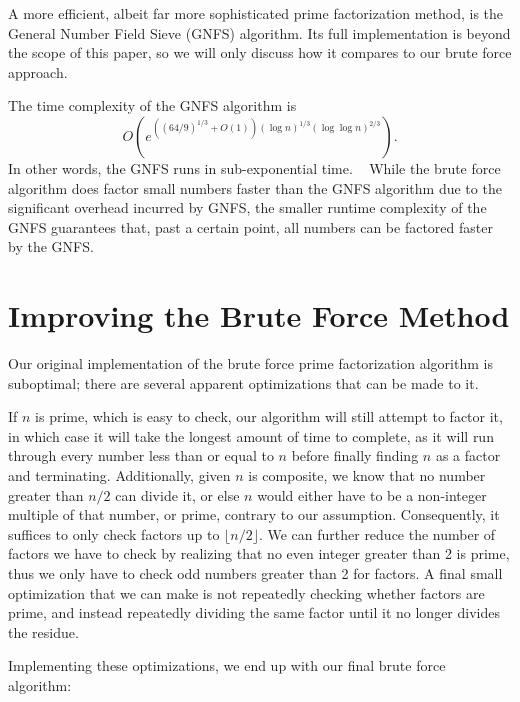 \documentclass[letterpaper,twocolumn,12pt]{article}
\newcommand{\parens}[1]{\left( #1 \right)}
\begin{document}
    A more efficient, albeit far more sophisticated prime factorization
    method, is the General Number Field Sieve (GNFS) algorithm.
    Its full implementation is beyond the scope of this paper, so we will
    only discuss how it compares to our brute force approach.

    The time complexity of the GNFS algorithm is
    \[
        O\parens{e^{
            \parens{(64 / 9)^{1 / 3} + O(1)}
            \parens{\log n}^{1 / 3}(\log\log n)^{2 / 3}
        }}.
    \]
    In other words, the GNFS runs in sub-exponential time.
    ~\cite{TOTS}
    While the brute force algorithm does factor small numbers faster than the
    GNFS algorithm due to the significant overhead incurred by GNFS, the smaller
    runtime complexity of the GNFS guarantees that, past a certain point, all
    numbers can be factored faster by the GNFS.

    \section*{Improving the Brute Force Method}

    Our original implementation of the brute force prime factorization
    algorithm is suboptimal; there are several apparent optimizations that can
    be made to it.

    If \( n \) is prime, which is easy to check, our algorithm will still
    attempt to factor it, in which case it will take the longest amount of
    time to complete, as it will run through every number less than or equal to
    \( n \) before finally finding \( n \) as a factor and terminating.
    Additionally, given \( n \) is composite, we know that no number greater
    than \( n / 2 \) can divide it, or else \( n \) would either have to be a
    non-integer multiple of that number, or prime, contrary to our assumption.
    Consequently, it suffices to only check factors up to
    \( \lfloor n / 2 \rfloor \).
    We can further reduce the number of factors we have to check by realizing
    that no even integer greater than 2 is prime, thus we only have to check
    odd numbers greater than 2 for factors.
    A final small optimization that we can make is not repeatedly checking
    whether factors are prime, and instead repeatedly dividing the same factor
    until it no longer divides the residue.

    \pagebreak
    Implementing these optimizations, we end up with our final brute force
    algorithm:
\end{document}
